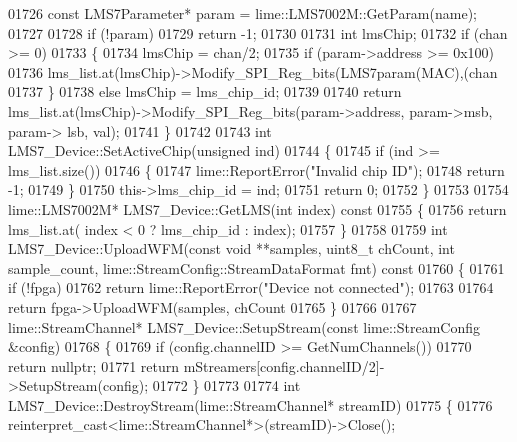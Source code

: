 \begin{DoxyCode}
{{{01726     \textcolor{keyword}{const} LMS7Parameter* param = lime::LMS7002M::GetParam(name);
01727 
01728     \textcolor{keywordflow}{if} (!param)
01729         \textcolor{keywordflow}{return} -1;
01730 
01731     \textcolor{keywordtype}{int} lmsChip;
01732     \textcolor{keywordflow}{if} (chan >= 0)
01733     \{
01734         lmsChip = chan/2;
01735         \textcolor{keywordflow}{if} (param->address >= 0x100)
01736             lms_list.at(lmsChip)->Modify\_SPI\_Reg\_bits(LMS7param(MAC),(chan%
01737     \}
01738     \textcolor{keywordflow}{else} lmsChip = lms_chip_id;
01739 
01740     \textcolor{keywordflow}{return} lms_list.at(lmsChip)->Modify\_SPI\_Reg\_bits(param->address, param->msb, param->
      lsb, val);
01741 \}
01742 
01743 \textcolor{keywordtype}{int} LMS7_Device::SetActiveChip(\textcolor{keywordtype}{unsigned} ind)
01744 \{
01745     \textcolor{keywordflow}{if} (ind >= lms_list.size())
01746     \{
01747         lime::ReportError(\textcolor{stringliteral}{"Invalid chip ID"});
01748         \textcolor{keywordflow}{return} -1;
01749     \}
01750     this->lms_chip_id = ind;
01751     \textcolor{keywordflow}{return} 0;
01752 \}
01753 
01754 lime::LMS7002M* LMS7_Device::GetLMS(\textcolor{keywordtype}{int} index)\textcolor{keyword}{ const}
01755 \textcolor{keyword}{}\{
01756     \textcolor{keywordflow}{return} lms_list.at( index < 0 ? lms_chip_id : index);
01757 \}
01758 
01759 \textcolor{keywordtype}{int} LMS7_Device::UploadWFM(\textcolor{keyword}{const} \textcolor{keywordtype}{void} **samples, uint8\_t chCount, \textcolor{keywordtype}{int} 
      sample_count, lime::StreamConfig::StreamDataFormat fmt)\textcolor{keyword}{ const}
01760 \textcolor{keyword}{}\{
01761     \textcolor{keywordflow}{if} (!fpga)
01762         \textcolor{keywordflow}{return} lime::ReportError(\textcolor{stringliteral}{"Device not connected"});
01763 
01764     \textcolor{keywordflow}{return} fpga->UploadWFM(samples, chCount%
01765 \}
01766 
01767 lime::StreamChannel* LMS7_Device::SetupStream(\textcolor{keyword}{const} lime::StreamConfig &config)
01768 \{
01769     \textcolor{keywordflow}{if} (config.channelID >= GetNumChannels())
01770         \textcolor{keywordflow}{return} \textcolor{keyword}{nullptr};
01771     \textcolor{keywordflow}{return} mStreamers[config.channelID/2]->SetupStream(config);
01772 \}
01773 
01774 \textcolor{keywordtype}{int} LMS7_Device::DestroyStream(lime::StreamChannel* streamID)
01775 \{
01776     \textcolor{keyword}{reinterpret\_cast<}lime::StreamChannel*\textcolor{keyword}{>}(streamID)->Close();
}}}
\end{DoxyCode}
